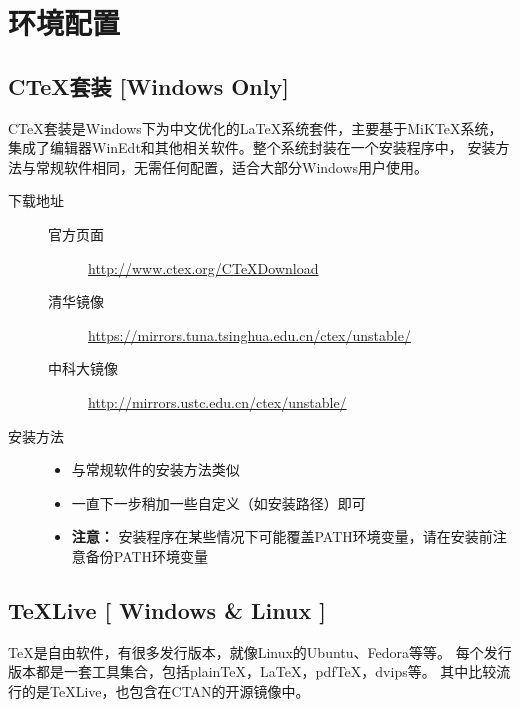 \chapter{环境配置}

\section{C\TeX{}套装 [Windows Only]}

C\TeX{}套装是Windows下为中文优化的\LaTeX{}系统套件，主要基于MiKTeX系统，
集成了编辑器WinEdt和其他相关软件。整个系统封装在一个安装程序中，
安装方法与常规软件相同，无需任何配置，适合大部分Windows用户使用。

\begin{description}
    \item[下载地址] \hfill
    \begin{description}
        \item[官方页面]
            \url{http://www.ctex.org/CTeXDownload}
        \item[清华镜像]
            \url{https://mirrors.tuna.tsinghua.edu.cn/ctex/unstable/}
        \item[中科大镜像]
            \url{http://mirrors.ustc.edu.cn/ctex/unstable/}
    \end{description}
    \item[安装方法] \hfill
        \begin{itemize}
            \item[] 与常规软件的安装方法类似
            \item[] 一直下一步稍加一些自定义（如安装路径）即可
            \item[] {\bf 注意：} 安装程序在某些情况下可能覆盖PATH环境变量，请在安装前注意备份PATH环境变量
        \end{itemize}
\end{description}

\section{\TeX{}Live [ Windows \& Linux ]}

\TeX{}是自由软件，有很多发行版本，就像Linux的Ubuntu、Fedora等等。
每个发行版本都是一套工具集合，包括plain\TeX{}，\LaTeX{}，pdf\TeX{}，dvips等。
其中比较流行的是\TeX{}Live，也包含在CTAN的开源镜像中。


